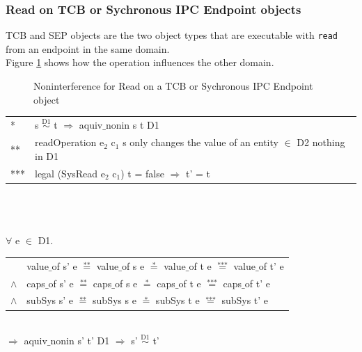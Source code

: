 \documentclass[pdftex,11pt,a4paper,twoside]{article}
\begin{document}
\subsubsection{Read on TCB or Sychronous IPC Endpoint objects}
TCB and SEP objects are the two object types that are executable with \texttt{read} from an endpoint in the same domain. \\
Figure \ref{fig:ReadTCB} shows how the operation influences the other domain.
\begin{flushleft}
\begin{figure}[H]
\caption{Noninterference for Read on a TCB or Sychronous IPC Endpoint object}
\label{fig:ReadTCB}
\end{figure}
\end{flushleft}
\begin{tabular}{ll}
* & s $\overset{\text{D1}}{\sim}$ t $\Rightarrow$ aquiv$\_$nonin s t D1	\\ 
** & readOperation e$_2$ c$_1$ s only changes the value of an entity $\in$ D2 nothing in D1 \\ 
*** & legal (SysRead e$_2$ c$_1$) t = false $\Rightarrow$ t' = t
\end{tabular} \\ \\ \\
$\forall$ e $\in$ D1. \\ 
\begin{tabular}{ll}
& value$\_$of s' e $\overset{\text{**}}{=}$ value$\_$of s e $\overset{\text{*}}{=}$ value$\_$of t e $\overset{\text{***}}{=}$ value$\_$of t' e \\
$\wedge$ & caps$\_$of s' e $\overset{\text{**}}{=}$ caps$\_$of s e $\overset{\text{*}}{=}$ caps$\_$of t e $\overset{\text{***}}{=}$ caps$\_$of t' e \\
$\wedge$ & subSys s' e $\overset{\text{**}}{=}$ subSys s e $\overset{\text{*}}{=}$ subSys t e $\overset{\text{***}}{=}$ subSys t' e
\end{tabular} \\
$\Rightarrow$ aquiv$\_$nonin s' t' D1 $\Rightarrow$ s' $\overset{\text{D1}}{\sim}$ t'
\end{document}
